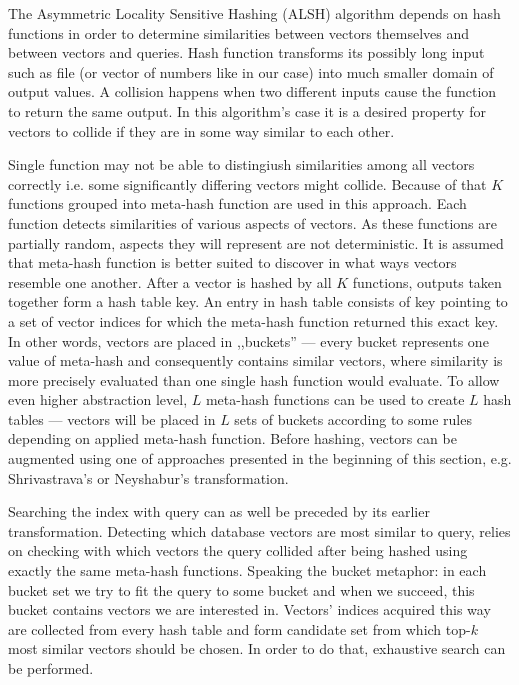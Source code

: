 The Asymmetric Locality Sensitive Hashing (ALSH) \cite{alsh} algorithm depends on hash functions
in order to determine similarities between vectors themselves and between vectors and queries.
Hash function transforms its possibly long input such as file (or vector of numbers like in our case)
into much smaller domain of output values.
A collision happens when two different inputs cause the function to return the same output.
In this algorithm's case it is a desired property for vectors to collide if they are in some way similar to each other.
\par
Single function may not be able to distingiush similarities among all vectors correctly i.e. some
significantly differing vectors might collide. Because of that $K$ functions grouped into
meta-hash function are used in this approach. Each function detects similarities of various aspects of vectors.
As these functions are partially random, aspects they will represent are not deterministic.
It is assumed that meta-hash function is better suited to discover in what ways vectors
resemble one another.
After a vector is hashed by all $K$ functions, outputs taken together form a hash table key.
An entry in hash table consists of key pointing to a set of vector indices for which the meta-hash function
returned this exact key. In other words, vectors are placed in ,,buckets'' ---
every bucket represents one value of meta-hash and consequently contains similar vectors, where
similarity is more precisely evaluated than one single hash function would evaluate.
To allow even higher abstraction level, $L$ meta-hash functions can be used to create $L$ hash tables ---
vectors will be placed in $L$ sets of buckets according to some rules depending on applied meta-hash function.
Before hashing, vectors can be augmented using one of approaches presented in the beginning
of this section, e.g. Shrivastrava's or Neyshabur's transformation.
\par
Searching the index with query can as well be preceded by its earlier transformation.
Detecting which database vectors are most similar to query, relies on checking with which
vectors the query collided after being hashed using exactly the same meta-hash functions.
Speaking the bucket metaphor: in each bucket set we try to fit the query to some bucket and when
we succeed, this bucket contains vectors we are interested in.
Vectors' indices acquired this way are collected from every hash table and form candidate set from which top-$k$
most similar vectors should be chosen. In order to do that, exhaustive search can be performed.
